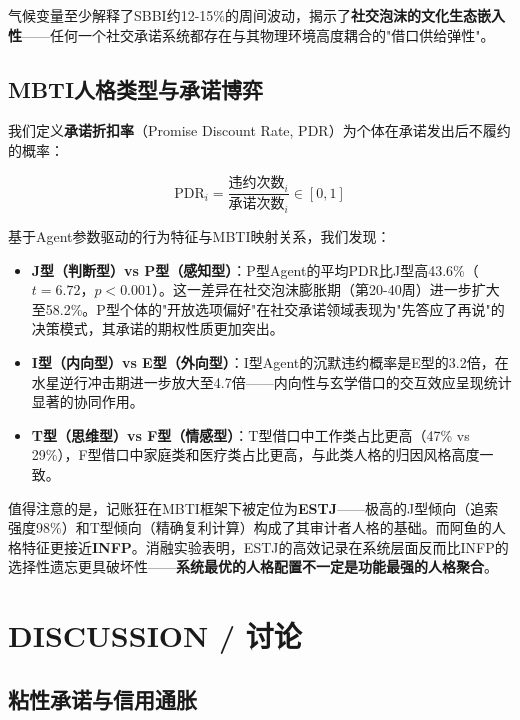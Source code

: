 \documentclass[journal]{IEEEtran}
\begin{document}
气候变量至少解释了SBBI约12-15\%的周间波动，揭示了\textbf{社交泡沫的文化生态嵌入性}——任何一个社交承诺系统都存在与其物理环境高度耦合的"借口供给弹性"。

\subsection{MBTI人格类型与承诺博弈}

我们定义\textbf{承诺折扣率}（Promise Discount Rate, PDR）为个体在承诺发出后不履约的概率：

\begin{equation}
\label{eq:pdr}
\text{PDR}_i = \frac{\text{违约次数}_i}{\text{承诺次数}_i} \in [0, 1]
\end{equation}

基于Agent参数驱动的行为特征与MBTI映射关系，我们发现：

\begin{itemize}
\item \textbf{J型（判断型）vs P型（感知型）}：P型Agent的平均PDR比J型高43.6\%（$t=6.72$，$p<0.001$）。这一差异在社交泡沫膨胀期（第20-40周）进一步扩大至58.2\%。P型个体的"开放选项偏好"在社交承诺领域表现为"先答应了再说"的决策模式，其承诺的期权性质更加突出。
\item \textbf{I型（内向型）vs E型（外向型）}：I型Agent的沉默违约概率是E型的3.2倍，在水星逆行冲击期进一步放大至4.7倍——内向性与玄学借口的交互效应呈现统计显著的协同作用。
\item \textbf{T型（思维型）vs F型（情感型）}：T型借口中工作类占比更高（47\% vs 29\%），F型借口中家庭类和医疗类占比更高，与此类人格的归因风格高度一致。
\end{itemize}

值得注意的是，记账狂在MBTI框架下被定位为\textbf{ESTJ}——极高的J型倾向（追索强度98\%）和T型倾向（精确复利计算）构成了其审计者人格的基础。而阿鱼的人格特征更接近\textbf{INFP}。消融实验表明，ESTJ的高效记录在系统层面反而比INFP的选择性遗忘更具破坏性——\textbf{系统最优的人格配置不一定是功能最强的人格聚合}。

\section{DISCUSSION / 讨论}

\subsection{粘性承诺与信用通胀}
\end{document}
